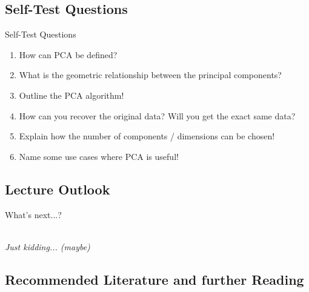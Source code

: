 \subsection{Self-Test Questions}

\begin{frame}{Self-Test Questions}{}\important
	\begin{enumerate}
		\item How can PCA be defined?
		\item What is the geometric relationship between the principal components?
		\item Outline the PCA algorithm!
		\item How can you recover the original data? Will you get the exact same data?
		\item Explain how the number of components / dimensions can be chosen!
		\item Name some use cases where PCA is useful!
	\end{enumerate}
\end{frame}


\subsection{Lecture Outlook}

\begin{frame}{What's next...?}{}
	\vfill
	\begin{center}
		{\Huge{}} \\
		\textit{Just kidding... (maybe)}
	\end{center}
	\vfill
\end{frame}


\subsection{Recommended Literature and further Reading}

